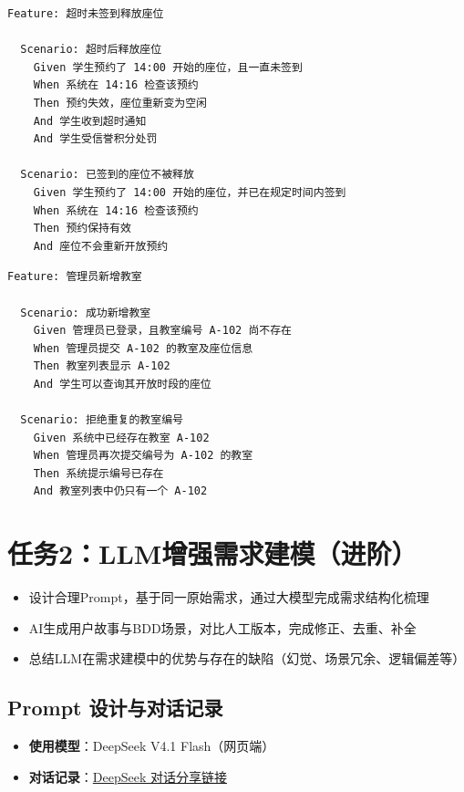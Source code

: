 \documentclass[11pt,a4paper]{article}
\begin{document}
\newpage

\begin{framed}
\begin{verbatim}
Feature: 超时未签到释放座位

  Scenario: 超时后释放座位
    Given 学生预约了 14:00 开始的座位，且一直未签到
    When 系统在 14:16 检查该预约
    Then 预约失效，座位重新变为空闲
    And 学生收到超时通知
    And 学生受信誉积分处罚

  Scenario: 已签到的座位不被释放
    Given 学生预约了 14:00 开始的座位，并已在规定时间内签到
    When 系统在 14:16 检查该预约
    Then 预约保持有效
    And 座位不会重新开放预约
\end{verbatim}
\end{framed}

\begin{framed}
\begin{verbatim}
Feature: 管理员新增教室

  Scenario: 成功新增教室
    Given 管理员已登录，且教室编号 A-102 尚不存在
    When 管理员提交 A-102 的教室及座位信息
    Then 教室列表显示 A-102
    And 学生可以查询其开放时段的座位

  Scenario: 拒绝重复的教室编号
    Given 系统中已经存在教室 A-102
    When 管理员再次提交编号为 A-102 的教室
    Then 系统提示编号已存在
    And 教室列表中仍只有一个 A-102
\end{verbatim}
\end{framed}

\section{任务2：LLM增强需求建模（进阶）}

\begin{itemize}
    \item 设计合理Prompt，基于同一原始需求，通过大模型完成需求结构化梳理
    \item AI生成用户故事与BDD场景，对比人工版本，完成修正、去重、补全
    \item 总结LLM在需求建模中的优势与存在的缺陷（幻觉、场景冗余、逻辑偏差等）
\end{itemize}

\subsection{Prompt 设计与对话记录}

\begin{itemize}
    \item \textbf{使用模型}：DeepSeek V4.1 Flash（网页端）
    \item \textbf{对话记录}：\href{https://chat.deepseek.com/share/yctx43ujc0k2kh6jxo}{DeepSeek 对话分享链接}
\end{itemize}
\end{document}

